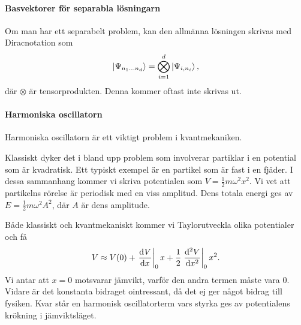 \paragraph{Basvektorer för separabla lösningarn}
Om man har ett separabelt problem, kan den allmänna lösningen skrivas med Diracnotation som
\begin{align*}
	\ket{\Psi_{n_{1}\dots n_{d}}} = \bigotimes\limits_{i = 1}^{d}\ket{\Psi_{i, n_{i}}},
\end{align*}
där $\otimes$ är tensorprodukten. Denna kommer oftast inte skrivas ut.

\paragraph{Harmoniska oscillatorn}
Harmoniska oscillatorn är ett viktigt problem i kvantmekaniken.

Klassiskt dyker det i bland upp problem som involverar partiklar i en potential som är kvadratisk. Ett typiskt exempel är en partikel som är fast i en fjäder. I dessa sammanhang kommer vi skriva potentialen som $V = \frac{1}{2}m\omega^{2}x^{2}$. Vi vet att partikelns rörelse är periodisk med en viss amplitud. Dens totala energi ges av $E = \frac{1}{2}m\omega^{2}A^{2}$, där $A$ är dens amplitude.

Både klassiskt och kvantmekaniskt kommer vi Taylorutveckla olika potentialer och få
\begin{align*}
	V \approx V(0) + \deval{V}{x}{0}x + \frac{1}{2}\deval[2]{V}{x}{0}x^{2}.
\end{align*}
Vi antar att $x = 0$ motsvarar jämvikt, varför den andra termen måste vara $0$. Vidare är det konstanta bidraget ointressant, då det ej ger något bidrag till fysiken. Kvar står en harmonisk oscillatorterm vars styrka ges av potentialens krökning i jämviktsläget.